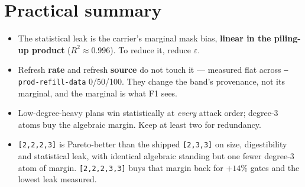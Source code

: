 \documentclass[11pt]{article}
\newcommand{\code}[1]{\texttt{#1}}
\begin{document}
\section{Practical summary}

\begin{itemize}
  \item The statistical leak is the carrier's marginal mask bias, \textbf{linear
        in the piling-up product} ($R^2 \approx 0.996$). To reduce it, reduce
        $\varepsilon$.
  \item Refresh \textbf{rate} and refresh \textbf{source} do not touch it ---
        measured flat across \code{--prod-refill-data} 0/50/100. They change the
        band's provenance, not its marginal, and the marginal is what F1 sees.
  \item Low-degree-heavy plans win statistically at \emph{every} attack order;
        degree-3 atoms buy the algebraic margin. Keep at least two for
        redundancy.
  \item \code{[2,2,2,3]} is Pareto-better than the shipped \code{[2,3,3]} on
        size, digestibility and statistical leak, with identical algebraic
        standing but one fewer degree-3 atom of margin. \code{[2,2,2,3,3]} buys
        that margin back for $+14\%$ gates and the lowest leak measured.
\end{itemize}
\end{document}
